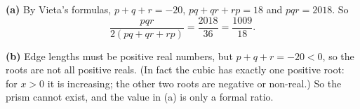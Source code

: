 \textbf{(a)} By Vieta's formulas, $p+q+r=-20$, $pq+qr+rp=18$ and $pqr=2018$. So
\[
\dfrac{pqr}{2(pq+qr+rp)}=\dfrac{2018}{36}=\boxed{\dfrac{1009}{18}}.
\]

\textbf{(b)} Edge lengths must be positive real numbers, but $p+q+r=-20<0$, so the roots are not all positive reals. (In fact the cubic has exactly one positive root: for $x>0$ it is increasing; the other two roots are negative or non-real.) So the prism cannot exist, and the value in (a) is only a formal ratio.
